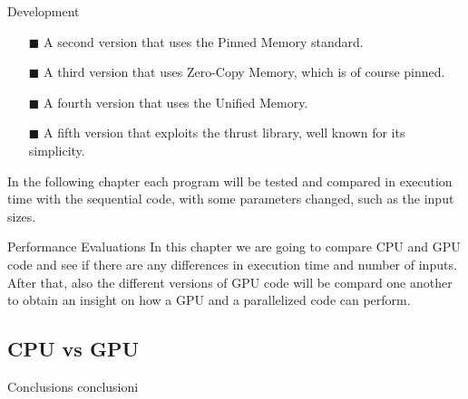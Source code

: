 \documentclass[a4paper,oneside,11pt,DIV12,headsepline,footexclude,headexclude]{scrartcl}
\begin{document}
\begin{section}{Development}
\begin{enumerate}
    \item[$\blacksquare$] A second version that uses the Pinned Memory standard.
\\
    \item[$\blacksquare$] A third version that uses Zero-Copy Memory, which is of course pinned.
\\
    \item[$\blacksquare$] A fourth version that uses the Unified Memory.
\\
    \item[$\blacksquare$] A fifth version that exploits the thrust library, well known for its simplicity.
\end{enumerate}
In the following chapter each program will be tested and compared in execution time with the sequential code, with some parameters changed, such as the input sizes.
\end{section}
\begin{section}{Performance Evaluations}
In this chapter we are going to compare CPU and GPU code and see if there are any differences in execution time and number of inputs. After that, also the different versions of GPU code will be compard one another to obtain an insight on how a GPU and a parallelized code can perform.
\subsection{CPU vs GPU}

\end{section}
\begin{section}{Conclusions}
conclusioni
\end{section}
\end{document}
